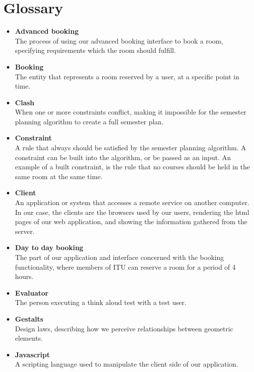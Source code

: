 \clearpage
\pagebreak
\section{Glossary}
\label{sec:glossary}
\begin{itemize}
\item \textbf{Advanced booking}\\
The process of using our advanced booking interface to book a room, specifying requirements which the room should fulfill. 
	
\item \textbf{Booking}\\ 
The entity that represents a room reserved by a user, at a specific point in time.

\item \textbf{Clash}\\
When one or more constraints conflict, making it impossible for the semester planning algorithm to create a full semester plan.

\item \textbf{Constraint}\\
A rule that always should be satisfied by the semester planning algorithm. A constraint can be built into the algorithm, or be passed as an input. An example of a built constraint, is the rule that no courses should be held in the same room at the same time.

\item \textbf{Client}\\
An application or system that accesses a remote service on another computer. In our case, the clients are the browsers used by our users, rendering the html pages of our web application, and showing the information gathered from the server.

\item \textbf{Day to day booking}\\
The part of our application and interface concerned with the booking functionality, where members of ITU can reserve a room for a period of 4 hours.

\item \textbf{Evaluator}\\
The person executing a think aloud test with a test user.

\item \textbf{Gestalts}\\
Design laws, describing how we perceive relationships between geometric elements.

\item \textbf{Javascript}\\
A scripting language used to manipulate the client side of our application.
	

\end{itemize}
